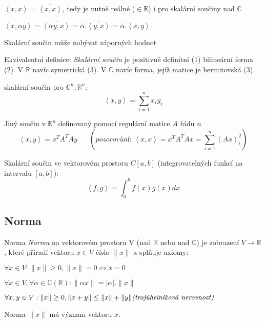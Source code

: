 \begin{pozorovani}
\begin{pitemize}
	\item $\left<x,x\right>=\overline{\left<x,x\right>}$, tedy je nutně reálné ($\in\mathbb{R}$) i pro skalární součiny nad $\mathbb{C}$
	\item $\left<x,\alpha y\right> = \overline{\left<\alpha y,x\right>} = \overline{\alpha}.\overline{\left<y,x\right>} = \overline{\alpha}.\left<x,y\right>$
	\item Skalární součin může nabývat záporných hodnot
\end{pitemize}
\end{pozorovani}

\begin{definice}
Ekvivalentní definice: \emph{Skalární součin} je pozitivně definitní (1) bilineární forma (2). V $\mathbb{R}$ navíc symetrická (3). V $\mathbb{C}$ navíc forma, jejíž matice je hermitovská (3).
\end{definice}

\begin{priklady}
\begin{pitemize}
	\item {} skalární součin pro $\mathbb{C}^n, \mathbb{R}^n$: $$\left<x,y\right> = \sum_{i=1}^{n} x_i \overline{y_i}$$
	\item Jiný součin v $\mathbb{R}^n$ definovaný pomocí regulární matice $A$ řádu $n$
		$$\left<x,y\right>=x^T A^T A y \;\;\;\;\;\; (\textit{pozorování: } \left<x,x\right> = x^T A^T A x = \sum_{i=1}^n (Ax)_i^2)$$
	\item Skalární součin ve vektorovém prostoru $C[a,b]$ (integrovatelných funkcí na intervalu $[a,b]$):
		$$\left<f,g\right> = \int_a^b f(x) g(x) dx$$
\end{pitemize}
\end{priklady}

\subsection{Norma}

\begin{definiceN}{Norma}
\emph{Norma} na vektorovém prostoru V (nad $\mathbb{R}$ nebo nad $\mathbb{C}$) je zobrazení $V \rightarrow \mathbb{R}$, které přiradí vektoru $x \in V$ číslo $\|x\|$ a splňuje axiomy:
\begin{penumerate}
	\item $\forall x \in V: \|x\| \ge 0, \|x\|=0 \Leftrightarrow x = 0$
	\item $\forall x \in V, \forall \alpha \in \mathbb{C} (\mathbb{R}): \|\alpha x\| = |\alpha|.\|x\|$
	\item $\forall x,y \in V: \|x\| \ge 0, \|x+y\| \le \|x\| + \|y\| \hfill \textit{(trojúhelníková nerovnost)}$
\end{penumerate}
Norma $\|x\|$ má význam  vektoru $x$.
\end{definiceN}

